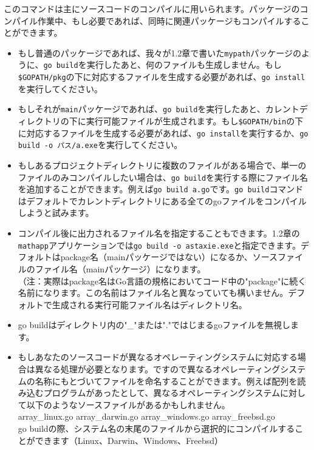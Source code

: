 このコマンドは主にソースコードのコンパイルに用いられます。パッケージのコンパイル作業中、もし必要であれば、同時に関連パッケージもコンパイルすることができます。

\begin{itemize}
  \item もし普通のパッケージであれば、我々が1.2章で書いた\texttt{mypath}パッケージのように、\texttt{go build}を実行したあと、何のファイルも生成しません。もし\texttt{\$GOPATH\//pkg}の下に対応するファイルを生成する必要があれば、\texttt{go install}を実行してください。
  \item もしそれが\texttt{main}パッケージであれば、\texttt{go build}を実行したあと、カレントディレクトリの下に実行可能ファイルが生成されます。もし\texttt{\$GOPATH\//bin}の下に対応するファイルを生成する必要があれば、\texttt{go install}を実行するか、\texttt{go build -o パス\//a.exe}を実行してください。
  \item もしあるプロジェクトディレクトリに複数のファイルがある場合で、単一のファイルのみコンパイルしたい場合は、\texttt{go build}を実行する際にファイル名を追加することができます。例えば\texttt{go build a.go}です。\texttt{go build}コマンドはデフォルトでカレントディレクトリにある全てのgoファイルをコンパイルしようと試みます。
  \item コンパイル後に出力されるファイル名を指定することもできます。1.2章の\texttt{mathapp}アプリケーションでは\texttt{go build -o astaxie.exe}と指定できます。デフォルトはpackage名（mainパッケージではない）になるか、ソースファイルのファイル名（mainパッケージ）になります。\\（注：実際はpackage名はGo言語の規格においてコード中の"package"に続く名前になります。この名前はファイル名と異なっていても構いません。デフォルトで生成される実行可能ファイル名はディレクトリ名。
  \item go buildはディレクトリ内の"\_"または"."ではじまるgoファイルを無視します。
  \item もしあなたのソースコードが異なるオペレーティングシステムに対応する場合は異なる処理が必要となります。ですので異なるオペレーティングシステムの名称にもとづいてファイルを命名することができます。例えば配列を読み込むプログラムがあったとして、異なるオペレーティングシステムに対して以下のようなソースファイルがあるかもしれません。\\array\_linux.go array\_darwin.go array\_windows.go array\_freebsd.go\\go buildの際、システム名の末尾のファイルから選択的にコンパイルすることができます（Linux、Darwin、Windows、Freebsd）
\end{itemize}

